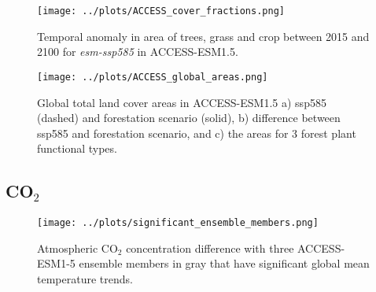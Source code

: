 \documentclass[]{article}
\begin{document}
\begin{figure}[H]
    \centering
    \texttt{[image: ../plots/ACCESS\_cover\_fractions.png]}
    \caption{Temporal anomaly in area of trees, grass and crop between 2015 and 2100 for \textit{esm-ssp585} in ACCESS-ESM1.5.
    }
    \label{fig:ACCESS_land_cover}
\end{figure}

\begin{figure}[H]
    \centering
    \texttt{[image: ../plots/ACCESS\_global\_areas.png]}
    \caption{Global total land cover areas in ACCESS-ESM1.5 a) ssp585 (dashed) and forestation scenario (solid), b) difference between ssp585 and forestation scenario, and c) the areas for 3 forest plant functional types.}
    \label{fig:ACCESS_land_use}
\end{figure}

\subsection{CO$_2$}

\begin{figure}[H]
    \centering
    \texttt{[image: ../plots/significant\_ensemble\_members.png]}
    \caption{Atmospheric CO$_2$ concentration difference with three ACCESS-ESM1-5 ensemble members in gray that have significant global mean temperature trends.}
    \label{fig:models_co2_access_members}
\end{figure}
\end{document}
